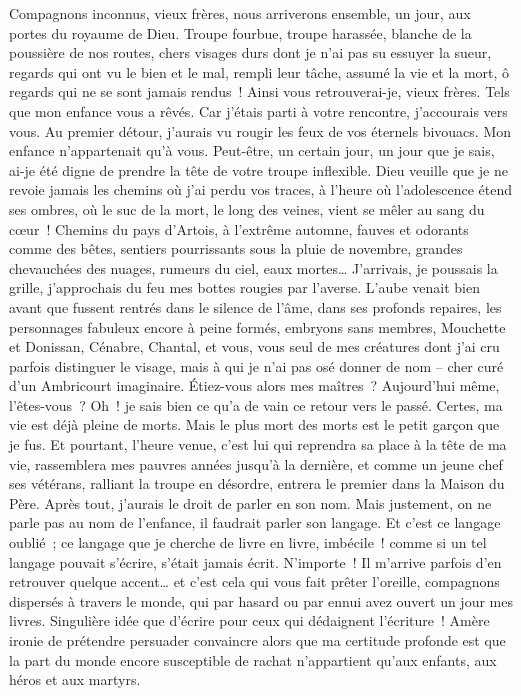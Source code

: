 \documentclass[french,twoside]{book} %
\begin{document}
\noindent Compagnons inconnus, vieux frères, nous arriverons ensemble, un jour, aux portes du royaume de Dieu. Troupe fourbue, troupe harassée, blanche de la poussière de nos routes, chers visages durs dont je n’ai pas su essuyer la sueur, regards qui ont vu le bien et le mal, rempli leur tâche, assumé la vie et la mort, ô regards qui ne se sont jamais rendus ! Ainsi vous retrouverai-je, vieux frères. Tels que mon enfance vous a rêvés. Car j’étais parti à votre rencontre, j’accourais vers vous. Au premier détour, j’aurais vu rougir les feux de vos éternels bivouacs. Mon enfance n’appartenait qu’à vous. Peut-être, un certain jour, un jour que je sais, ai-je été digne de prendre la tête de votre troupe inflexible. Dieu veuille que je ne revoie jamais les chemins où j’ai perdu vos traces, à l’heure où l’adolescence étend ses ombres, où le suc de la mort, le long des veines, vient se mêler au sang du cœur ! Chemins du pays d’Artois, à l’extrême automne, fauves et odorants comme des bêtes, sentiers pourrissants sous la pluie de novembre, grandes chevauchées des nuages, rumeurs du ciel, eaux mortes… J’arrivais, je poussais la grille, j’approchais du feu mes bottes rougies par l’averse. L’aube venait bien avant que fussent rentrés dans le silence de l’âme, dans ses profonds repaires, les personnages fabuleux encore à peine formés, embryons sans membres, Mouchette et Donissan, Cénabre, Chantal, et vous, vous seul de mes créatures dont j’ai cru parfois distinguer le visage, mais à qui je n’ai pas osé donner de nom – cher curé d’un Ambricourt imaginaire. Étiez-vous alors mes maîtres ? Aujourd’hui même, l’êtes-vous ? Oh ! je sais bien ce qu’a de vain ce retour vers le passé. Certes, ma vie est déjà pleine de morts. Mais le plus mort des morts est le petit garçon que je fus. Et pourtant, l’heure venue, c’est lui qui reprendra sa place à la tête de ma vie, rassemblera mes pauvres années jusqu’à la dernière, et comme un jeune chef ses vétérans, ralliant la troupe en désordre, entrera le premier dans la Maison du Père. Après tout, j’aurais le droit de parler en son nom. Mais justement, on ne parle pas au nom de l’enfance, il faudrait parler son langage. Et c’est ce langage oublié ; ce langage que je cherche de livre en livre, imbécile ! comme si un tel langage pouvait s’écrire, s’était jamais écrit. N’importe ! Il m’arrive parfois d’en retrouver quelque accent… et c’est cela qui vous fait prêter l’oreille, compagnons dispersés à travers le monde, qui par hasard ou par ennui avez ouvert un jour mes livres. Singulière idée que d’écrire pour ceux qui dédaignent l’écriture ! Amère ironie de prétendre persuader convaincre alors que ma certitude profonde est que la part du monde encore susceptible de rachat n’appartient qu’aux enfants, aux héros et aux martyrs.\par
\end{document}
